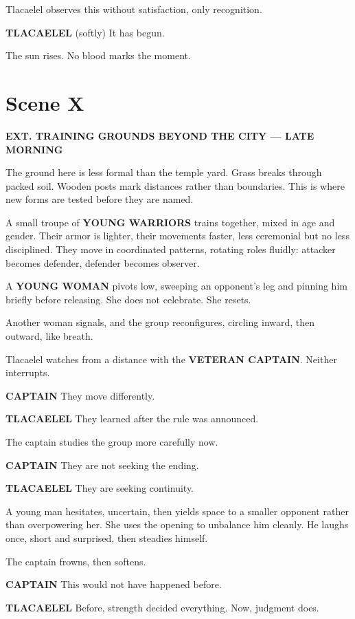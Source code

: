 \documentclass[12pt]{article}
\begin{document}
Tlacaelel observes this without satisfaction, only recognition.

\textbf{TLACAELEL}  
(softly)  
It has begun.

The sun rises. No blood marks the moment.

\section*{Scene X}

\textbf{EXT. TRAINING GROUNDS BEYOND THE CITY --- LATE MORNING}

The ground here is less formal than the temple yard. Grass breaks through packed soil. Wooden posts mark distances rather than boundaries. This is where new forms are tested before they are named.

A small troupe of \textbf{YOUNG WARRIORS} trains together, mixed in age and gender. Their armor is lighter, their movements faster, less ceremonial but no less disciplined. They move in coordinated patterns, rotating roles fluidly: attacker becomes defender, defender becomes observer.

A \textbf{YOUNG WOMAN} pivots low, sweeping an opponent’s leg and pinning him briefly before releasing. She does not celebrate. She resets.

Another woman signals, and the group reconfigures, circling inward, then outward, like breath.

Tlacaelel watches from a distance with the \textbf{VETERAN CAPTAIN}. Neither interrupts.

\textbf{CAPTAIN}  
They move differently.

\textbf{TLACAELEL}  
They learned after the rule was announced.

The captain studies the group more carefully now.

\textbf{CAPTAIN}  
They are not seeking the ending.

\textbf{TLACAELEL}  
They are seeking continuity.

A young man hesitates, uncertain, then yields space to a smaller opponent rather than overpowering her. She uses the opening to unbalance him cleanly. He laughs once, short and surprised, then steadies himself.

The captain frowns, then softens.

\textbf{CAPTAIN}  
This would not have happened before.

\textbf{TLACAELEL}  
Before, strength decided everything.  
Now, judgment does.
\end{document}
